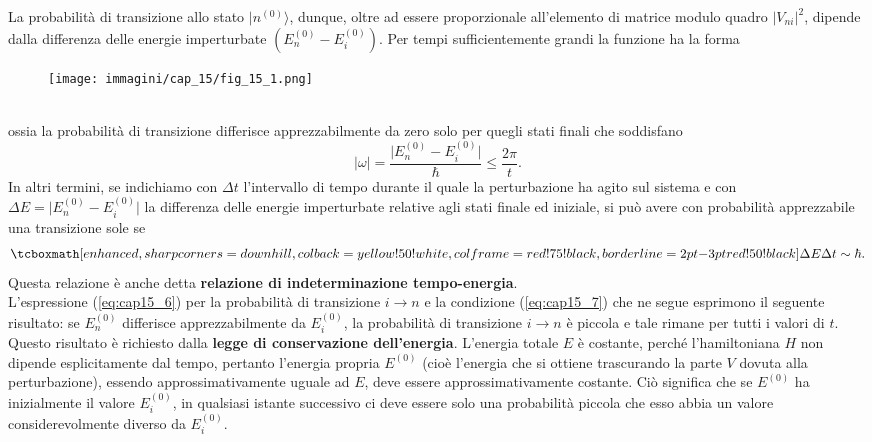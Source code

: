La probabilità di transizione allo stato $\vert n ^{(0)} \rangle$, dunque, oltre ad essere proporzionale all'elemento di matrice modulo quadro $\vert V_{ni}\vert ^2$, dipende dalla differenza delle energie imperturbate $(E_n ^{(0)} - E_i ^{(0)}) $. Per tempi sufficientemente grandi la funzione ha la forma
\begin{figure}[!htbp]
\begin{center}
\texttt{[image: immagini/cap\_15/fig\_15\_1.png]}
\end{center}
\end{figure}\\
ossia la probabilità di transizione differisce apprezzabilmente da zero solo per quegli stati finali che soddisfano
\begin{equation}
\vert \omega \vert = \frac{\vert E_n ^{(0)} - E_i ^{(0)}\vert}{\hbar} \leq \frac{2\pi}{t}.
\end{equation}
In altri termini, se indichiamo con $\Delta t$ l'intervallo di tempo durante il quale la perturbazione ha agito sul sistema e con $\Delta E = \vert E_n ^{(0)} - E_i ^{(0)}\vert$ la differenza delle energie imperturbate relative agli stati finale ed iniziale, si può avere con probabilità apprezzabile una transizione sole se
	\begin{equation}
		\tcboxmath[enhanced, sharp corners=downhill, colback=yellow!50!white, colframe=red!75!black, borderline={2pt}{-3pt}{red!50!black}]{
			\Delta E \Delta t \sim \hbar .
			}
	\label{eq:cap15_7}
	\end{equation}
Questa relazione è anche detta \textbf{relazione di indeterminazione tempo-energia}.\\

L'espressione (\ref{eq:cap15_6}) per la probabilità di transizione $i\rightarrow n$ e la condizione (\ref{eq:cap15_7}) che ne segue esprimono il seguente risultato: se $E_n ^{(0)}$ differisce apprezzabilmente da   $E_i ^{(0)}$, la probabilità di transizione $i \rightarrow n$ è piccola e tale rimane per tutti i valori di $t$. Questo risultato è richiesto dalla  \textbf{legge di conservazione dell'energia}. L'energia totale $E$ è costante, perché l'hamiltoniana $H$ non dipende esplicitamente dal tempo, pertanto l'energia propria $E^{(0)}$ (cioè l'energia che si ottiene trascurando la parte $V$ dovuta alla perturbazione), essendo approssimativamente uguale ad $E$, deve essere approssimativamente costante. Ciò significa che se $E^{(0)}$ ha inizialmente il valore $E _i ^{(0)}$, in qualsiasi istante successivo ci deve essere solo una probabilità piccola che esso abbia un valore considerevolmente diverso da $E _i ^{(0)}$.\\

